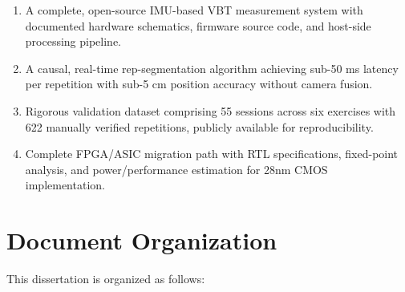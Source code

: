 \begin{enumerate}
    \item A complete, open-source IMU-based VBT measurement system with documented hardware schematics, firmware source code, and host-side processing pipeline.

    \item A causal, real-time rep-segmentation algorithm achieving sub-50 ms latency per repetition with sub-5 cm position accuracy without camera fusion.

    \item Rigorous validation dataset comprising 55 sessions across six exercises with 622 manually verified repetitions, publicly available for reproducibility.

    \item Complete FPGA/ASIC migration path with RTL specifications, fixed-point analysis, and power/performance estimation for 28nm CMOS implementation.
\end{enumerate}

\section{Document Organization}

This dissertation is organized as follows:

